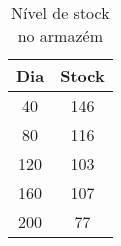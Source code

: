 \begin{table}[htpb]
\begin{center}
\begin{tabular}{cc}
\toprule
Dia & Stock	 	\\ \midrule
40 & 146                \\ 
80 & 116                \\ 
120 & 103               \\ 
160 & 107               \\ 
200 & 77     		\\ 
\bottomrule
\end{tabular}
\end{center}
\caption{Nível de stock no armazém}
\label{tab:tabela1}
\end{table}

